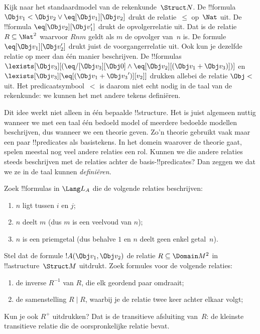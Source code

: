 \documentclass[../../../include/open-logic-section]{subfiles}
\begin{document}
\begin{ex}
Kijk naar het standaardmodel van de rekenkunde~$\Struct N$. De
!!{formula} $\Obj v_1 < \Obj v_2 \lor \eq[\Obj v_1][\Obj v_2]$
drukt de relatie~$\le$ op~$\Nat$ uit. De !!{formula}
$\eq[\Obj v_2][\Obj v_1']$ drukt de opvolgerrelatie uit. Dat is de
relatie $R \subseteq \Nat^2$ waarvoor $Rnm$ geldt als $m$ de opvolger
van~$n$ is. De formule $\eq[\Obj v_1][\Obj v_2']$ drukt juist de
voorgangerrelatie uit. Ook kun je dezelfde relatie op meer dan één
manier beschrijven. De !!{formula}s
$\lexists[\Obj v_3][(\eq/[\Obj v_3][\Obj 0] \land
  \eq[\Obj v_2][(\Obj v_1 + \Obj v_3)])]$ en $\lexists[\Obj
  v_3][\eq[(\Obj v_1 + {\Obj v_3}')][v_2]]$ drukken allebei de relatie
$\Obj <$ uit. Het predicaatsymbool~$<$ is daarom niet echt nodig in de
taal van de rekenkunde: we kunnen het met andere tekens definiëren.
\end{ex}

\begin{explain}
Dit idee werkt niet alleen in één bepaalde !!{structure}. Het is juist
algemeen nuttig wanneer we met een taal één bedoeld model of meerdere
bedoelde modellen beschrijven, dus wanneer we een theorie geven. Zo'n
theorie gebruikt vaak maar een paar !!{predicate}s als basistekens. In
het domein waarover de theorie gaat, spelen meestal nog veel andere
relaties een rol. Kunnen we die andere relaties steeds beschrijven met
de relaties achter de basis-!!{predicate}s? Dan zeggen we dat we ze in
de taal kunnen \emph{definiëren}.
\end{explain}

\begin{prob}
Zoek !!{formula}s in $\Lang L_A$ die de volgende relaties beschrijven:
\begin{enumerate}
\item $n$ ligt tussen $i$ en $j$;
\item $n$ deelt $m$ (dus $m$ is een veelvoud van $n$);
\item $n$ is een priemgetal (dus behalve $1$ en $n$ deelt geen enkel
  getal~$n$).
\end{enumerate}
\end{prob}

\begin{prob}
Stel dat de formule $!A(\Obj v_1, \Obj v_2)$ de relatie $R \subseteq
\Domain M^2$ in !!a{structure}~$\Struct M$ uitdrukt. Zoek formules voor
de volgende relaties:
\begin{enumerate}
\item de inverse $R^{-1}$ van $R$, die elk geordend paar omdraait;
\item de samenstelling $R \mid R$, waarbij je de relatie twee keer
  achter elkaar volgt;
\end{enumerate}
Kun je ook $R^+$ uitdrukken? Dat is de transitieve afsluiting van~$R$:
de kleinste transitieve relatie die de oorspronkelijke relatie bevat.
\end{prob}
\end{document}
